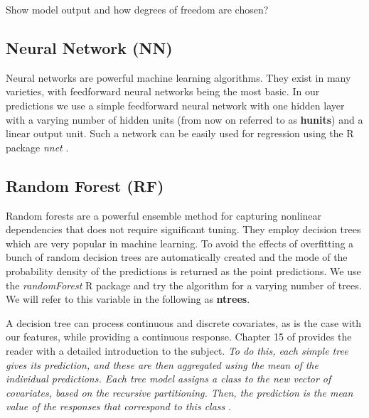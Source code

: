\documentclass[conference]{IEEEtran}
\begin{document}
Show model output and how degrees of freedom are chosen?

\subsection{Neural Network (NN)}
Neural networks are powerful machine learning algorithms. They exist in many varieties, with feedforward neural networks being the most basic. In our predictions we use a simple feedforward neural network with one hidden layer with a varying number of hidden units (from now on referred to as \textbf{hunits}) and a linear output unit. Such a network can be easily used for regression using the R package \emph{nnet} \cite{Venables2002}.

\subsection{Random Forest (RF)}
Random forests \cite{BreimanRF} are a powerful ensemble method for capturing nonlinear dependencies that does not require significant tuning. They employ decision trees which are very popular in machine learning. To avoid the effects of overfitting a bunch of random decision trees are automatically created and the mode of the probability density of the predictions is returned as the point predictions. We use the \emph{randomForest} R package \cite{Liaw2002} and try the algorithm for a varying number of trees. We will refer to this variable in the following as \textbf{ntrees}.

A decision tree can process continuous and discrete covariates, as is the case with our features, while providing a continuous response. Chapter 15 of \cite{hastie01statisticallearning} provides the reader with a detailed introduction to the subject. \textit{To do this, each simple tree gives its prediction, and these are then aggregated using the mean of the individual predictions. Each tree model assigns a class to the new vector of covariates, based on the recursive partitioning. Then, the prediction is the mean value of the responses that correspond to this class} \cite{Nedellec2014}.
\end{document}

